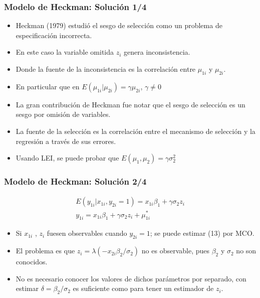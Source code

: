 \begin{frame}[fragile]
	\frametitle{Modelo de Heckman: Solución 1/4}
	
	\begin{itemize}
		\item Heckman (1979) estudió el sesgo de selección como un problema de especificación incorrecta.
		\item En este caso la variable omitida $z_i$ genera inconsistencia.
		\item Donde la fuente de la inconsistencia es la correlación entre $\mu_{1i}$ y $\mu_{2i}$.
		\item En particular que en $E(\mu_{1i} | \mu_{2i})=\gamma \mu_{2i}$, $\gamma \not = 0$
		\item La gran contribución de Heckman fue notar que el sesgo de selección es un sesgo por omisión de variables.
		\item La fuente de la selección es la correlación entre el mecanismo de selección y la regresión a través de sus errores.
		\item Usando LEI, se puede probar que $E(\mu_1,\mu_2)=\gamma \sigma_2^2$
	\end{itemize}
	
\end{frame}
\begin{frame}[fragile]
	\frametitle{Modelo de Heckman: Solución 2/4}
	
	\begin{eqnarray}
		E(y_{1i}|x_{1i},y_{2i}=1) = x_{1i}\beta_1+\gamma \sigma_2 z_i \\
		y_{1i} = x_{1i}\beta_1+\gamma \sigma_2 z_i + \mu_{1i}^*
	\end{eqnarray}
	
	\begin{itemize}
		\item Si $x_{1i}$ , $z_i$ fuesen observables cuando $y_{2i}=1$; se puede estimar (13) por MCO.
		\item El problema es que $z_i= \lambda(-x_{2i}\beta_2/\sigma_2)$ no es observable, pues $\beta_2$ y $\sigma_2$ no son conocidos.
		\item No es necesario conocer los valores de dichos parámetros por separado, con estimar $\delta=\beta_2/\sigma_2$ es suficiente como para tener un estimador de $z_i$.
	\end{itemize}
	
\end{frame}

